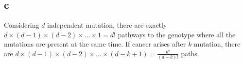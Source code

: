\subsection{c}

Considering $d$ independent mutation, there are exactly $d\times(d-1)\times(d-2)\times\dots\times1 = d!$ pathways to the genotype where all the mutations are present at the same time. If cancer arises after $k$ mutation, there are $d\times(d-1)\times(d-2)\times\dots\times(d-k+1) = \frac{d!}{(d-k)!}$ paths.

\setcounter{chapter}{5}
\setcounter{section}{0}
